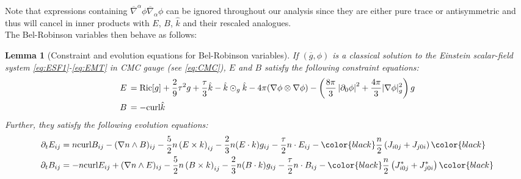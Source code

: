 \documentclass[11pt,leqno,textwidth=10cm]{amsart}
\numberwithin{equation}{section}
\theoremstyle{definition}
\theoremstyle{plain}
\newtheorem{lemma}[definition]{Lemma}
\newcommand{\1}{\mathbbm{1}}
\newcommand{\g}{\overline{g}}
\newcommand{\nabbar}{\overline{\nabla}}
\newcommand{\Ric}{\text{\normalfont{Ric}}}
\newcommand{\del}{\partial}
\newcommand{\curl}{\text{\normalfont{curl}}}
\newcommand{\change}[1]{\color{black}#1\color{black}}
\begin{document}
\change{\noindent Note that expressions containing $\nabbar^\alpha\phi\nabbar_\alpha\phi$ can be ignored throughout our analysis since they are either pure trace or antisymmetric and thus will cancel in inner products with $E$, $B$, $\hat{k}$ and their rescaled analogues.\\}
\noindent The Bel-Robinson variables then behave as follows:

\begin{lemma}[Constraint and evolution equations for Bel-Robinson variables]\label{lem:EEqBR} If $(\g,\phi)$ is a classical solution to the Einstein scalar-field system \eqref{eq:ESF1}-\eqref{eq:EMT} in CMC gauge (see \eqref{eq:CMC}), $E$ and $B$ satisfy the following constraint equations:
\begin{subequations}
\begin{align}
E&\,=\Ric[g]+\frac29\tau^2g+\frac\tau3\hat{k}-\hat{k}\odot_g\hat{k}-4\pi(\nabla\phi\otimes\nabla\phi)-\left(\frac{8\pi}3\left\lvert \del_0\phi\right\rvert^2+\frac{4\pi}3\lvert\nabla\phi\rvert_g^2\right)g\label{eq:constr-E}\\
\label{eq:constr-B} B&\,=-\curl\hat{k}
\end{align}
\end{subequations}
Further, they satisfy the following evolution equations:
\begin{subequations}
\begin{align}
\del_tE_{ij}&=n\curl{B}_{ij}-(\nabla n\wedge B)_{ij}-\frac52n\left(E\times k\right)_{ij}-\frac23n(E\cdot k)g_{ij}-\frac{\tau}2n\cdot E_{ij}-\change{\frac{n}2\left(J_{i0j}+J_{j0i}\right)} \label{eq:EEqE}\\
\del_tB_{ij}&=-n\curl{E}_{ij}+(\nabla n\wedge E)_{ij}-\frac52n\left(B\times k\right)_{ij}-\frac23n(B\cdot k)g_{ij}-\frac{\tau}2n\cdot B_{ij}-\change{\frac{n}2\left(J_{i0j}^\ast+J_{j0i}^\ast\right)}\label{eq:EEqB}
\end{align}
\end{subequations}
\end{lemma}
\end{document}
